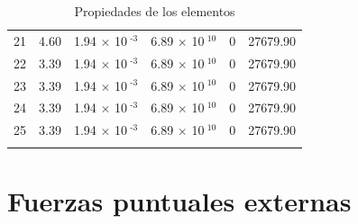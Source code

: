 \documentclass[a4paper,11pt]{article}
\begin{document}
\begin{center}
\begin{longtable}{|R{1.5cm}|R{2.4cm}|R{2.4cm}|R{2.4cm}|R{2.4cm}|R{2.4cm}|}
   21 &   4.60  &         1.94 $\times$ 10$^{\text{          -3}}$  &         6.89 $\times$ 10$^{\text{          10}}$  & 0  & 27679.90 \\
   22 &   3.39  &         1.94 $\times$ 10$^{\text{          -3}}$  &         6.89 $\times$ 10$^{\text{          10}}$  & 0  & 27679.90 \\
   23 &   3.39  &         1.94 $\times$ 10$^{\text{          -3}}$  &         6.89 $\times$ 10$^{\text{          10}}$  & 0  & 27679.90 \\
   24 &   3.39  &         1.94 $\times$ 10$^{\text{          -3}}$  &         6.89 $\times$ 10$^{\text{          10}}$  & 0  & 27679.90 \\
   25 &   3.39  &         1.94 $\times$ 10$^{\text{          -3}}$  &         6.89 $\times$ 10$^{\text{          10}}$  & 0  & 27679.90 \\
\bottomrule[0.8mm]                               
\caption{Propiedades de los elementos}             
\end{longtable}                                  
\end{center}                                     

\newpage   

\section{Fuerzas puntuales externas}             
\end{document}
